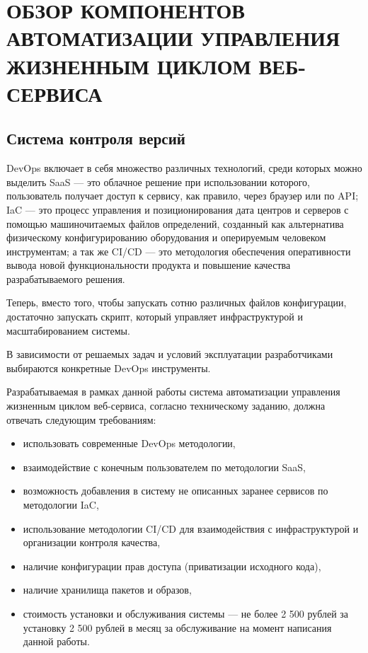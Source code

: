 \chapter{ОБЗОР КОМПОНЕНТОВ АВТОМАТИЗАЦИИ УПРАВЛЕНИЯ ЖИЗНЕННЫМ ЦИКЛОМ ВЕБ-СЕРВИСА}
\label{cha:analysis}

\section{Система контроля версий}

DevOps включает в себя множество различных технологий, среди которых можно выделить
SaaS --- это облачное решение при использовании \cite{cd}
которого, пользователь получает доступ к сервису, как правило, через браузер или по API;
IaC --- это процесс управления и позиционирования дата центров и серверов с помощью машиночитаемых файлов определений,
созданный как альтернатива физическому конфигурированию оборудования и оперируемым человеком инструментам;
а так же CI/CD --- это методология обеспечения оперативности вывода новой функциональности продукта и повышение качества разрабатываемого решения\cite{ciCd}.

Теперь, вместо того, чтобы запускать сотню различных файлов конфигурации,
достаточно запускать скрипт, который управляет инфраструктурой и масштабированием системы.

В зависимости от решаемых задач и условий эксплуатации разработчиками выбираются конкретные DevOps инструменты.

Разрабатываемая в рамках данной работы система автоматизации управления жизненным циклом веб-сервиса,
согласно техническому заданию, должна отвечать следующим требованиям:

\begin{itemize}
    \item использовать современные DevOps методологии,
    \item взаимодействие с конечным пользователем по методологии SaaS,
    \item возможность добавления в систему не описанных заранее сервисов по методологии IaC,
    \item использование методологии CI/CD для взаимодействия с инфраструктурой и организации контроля качества,
    \item наличие конфигурации прав доступа (приватизации исходного кода),
    \item наличие хранилища пакетов и образов,
    \item стоимость установки и обслуживания системы --- не более 2 500 рублей за установку 2 500 рублей в месяц за обслуживание на момент написания данной работы.
\end{itemize}

